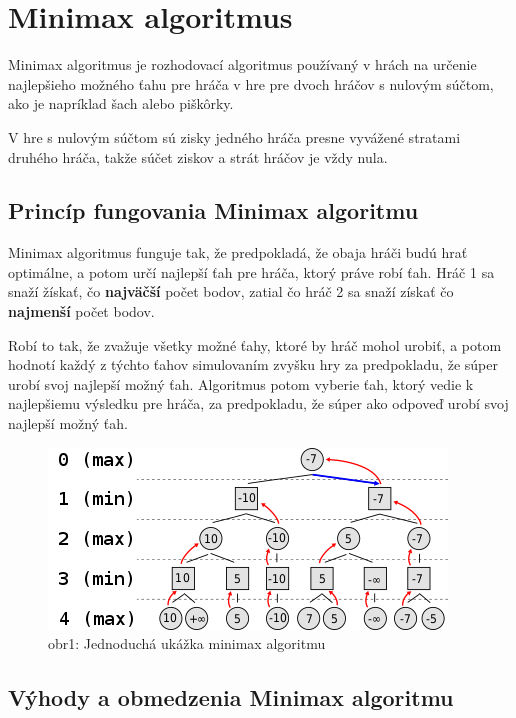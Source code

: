 \documentclass[10pt,twoside,slovak,a4paper]{article}
\begin{document}
\section{Minimax algoritmus} \label{minimax}
Minimax algoritmus je rozhodovací algoritmus používaný v hrách na určenie najlepšieho možného ťahu pre hráča v hre pre dvoch hráčov s nulovým súčtom, ako je napríklad šach alebo piškôrky. 

V hre s nulovým súčtom sú zisky jedného hráča presne vyvážené stratami druhého hráča, takže súčet ziskov a strát hráčov je vždy nula. 

\subsection{Princíp fungovania Minimax algoritmu} \label{principMinimax}
Minimax algoritmus funguje tak, že predpokladá, že obaja hráči budú hrať optimálne, a potom určí najlepší ťah pre hráča, ktorý práve robí ťah. Hráč 1 sa snaží žískať, čo \textbf{najväčší} počet bodov, zatial čo hráč 2 sa snaží získať čo \textbf{najmenší} počet bodov.

Robí to tak, že zvažuje všetky možné ťahy, ktoré by hráč mohol urobiť, a potom hodnotí každý z týchto ťahov simulovaním zvyšku hry za predpokladu, že súper urobí svoj najlepší možný ťah. Algoritmus potom vyberie ťah, ktorý vedie k najlepšiemu výsledku pre hráča, za predpokladu, že súper ako odpoveď urobí svoj najlepší možný ťah.
\begin{figure}[h]
    \centering
    \includegraphics[width=\textwidth]{minimax}
    \caption{obr1: Jednoduchá ukážka minimax algoritmu}
    \label{obr1}
\end{figure}

\subsection{Výhody a obmedzenia Minimax algoritmu} \label {vyhodyMinimax}
\end{document}
